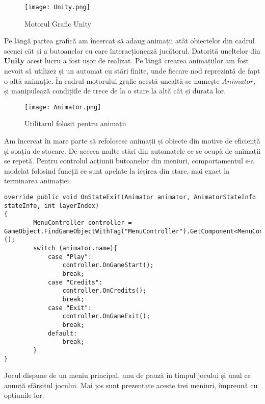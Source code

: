 \vspace{10mm}
\begin{figure}[H]
\centering
\texttt{[image: Unity.png]} \par
\caption{Motorul Grafic Unity}
\end{figure}

Pe lângă partea grafică am încercat să adaug animații atât obiectelor din cadrul scenei căt și a butoanelor cu care înteracționează jucătorul. Datorită uneltelor din \textbf{Unity} acest lucru a fost ușor de realizat. Pe lângă crearea animațiilor am fost nevoit să utilizez și un automat cu stări finite, unde fiecare nod reprezintă de fapt o altă animație. În cadrul motorului grafic acestă unealtă se numește $Animator$, și manipulează condițiile de trece de la o stare la altă cât și durata lor.\par

\vspace{10mm}
\begin{figure}[H]
\centering
\texttt{[image: Animator.png]} \par
\caption{Utilitarul folosit pentru animații}
\end{figure}

Am încercat în mare parte să refolosesc animații și obiecte din motive de eficiență și spațiu de stocare. De acceea multe stări din automatele ce se ocupă de animații se repetă. Pentru controlul acțiunii butoanelor din meniuri, comportamentul s-a modelat folosind funcții ce sunt apelate la ieșirea din stare, mai exact la terminarea animației.\par

\begin{lstlisting}[caption=Exemplu de folosire a evenimentului $OnStateExit$]
override public void OnStateExit(Animator animator, AnimatorStateInfo stateInfo, int layerIndex)
{
        MenuController controller = GameObject.FindGameObjectWithTag("MenuController").GetComponent<MenuController>();
        switch (animator.name){
            case "Play":
                controller.OnGameStart();
                break;
            case "Credits":
                controller.OnCredits();
                break;
            case "Exit":
                controller.OnGameExit();
                break;
            default:
                break;
        }
}
\end{lstlisting}

Jocul dispune de un meniu principal, unu de pauză în timpul jocului și unul ce anunță sfârșitul jocului. Mai jos sunt prezentate aceste trei meniuri, împreună cu opțiunile lor.\par

